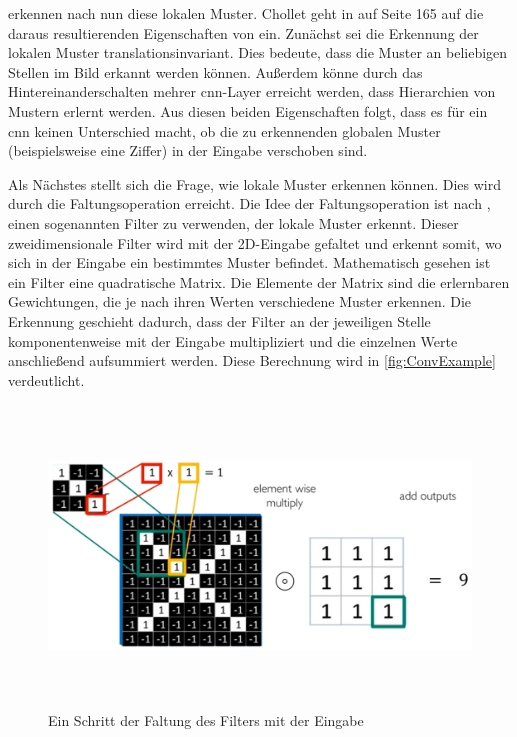  erkennen nach \cite[S. 164]{DeepLearningPythonKeras} nun diese lokalen Muster.
Chollet geht in \cite{DeepLearningPythonKeras} auf Seite 165 auf die daraus resultierenden Eigenschaften von  ein.
Zunächst sei die Erkennung der lokalen Muster translationsinvariant.
Dies bedeute, dass die Muster an beliebigen Stellen im Bild erkannt werden können.
Außerdem könne durch das Hintereinanderschalten mehrer \acrshort{cnn}-Layer erreicht werden, dass Hierarchien von Mustern erlernt werden.
Aus diesen beiden Eigenschaften folgt, dass es für ein \acrshort{cnn} keinen Unterschied macht, ob die zu erkennenden globalen Muster (beispielsweise eine Ziffer) in der Eingabe verschoben sind.

Als Nächstes stellt sich die Frage, wie  lokale Muster erkennen können.
Dies wird durch die Faltungsoperation erreicht.
Die Idee der Faltungsoperation ist nach \cite{6S191CNN}, einen sogenannten Filter zu verwenden, der lokale Muster erkennt.
Dieser zweidimensionale Filter wird mit der 2D-Eingabe gefaltet und erkennt somit, wo sich in der Eingabe ein bestimmtes Muster befindet.
Mathematisch gesehen ist ein Filter eine quadratische Matrix.
Die Elemente der Matrix sind die erlernbaren Gewichtungen, die je nach ihren Werten verschiedene Muster erkennen.
Die Erkennung geschieht dadurch, dass der Filter an der jeweiligen Stelle komponentenweise mit der Eingabe multipliziert und die einzelnen Werte anschließend aufsummiert werden.
Diese Berechnung wird in \autoref{fig:ConvExample} verdeutlicht.

\begin{figure}[h]
    \centering
    \includegraphics[width=1.0\textwidth,height=8cm,keepaspectratio=true]{content/images/ConvExample.png}
    \caption{Ein Schritt der Faltung des Filters mit der Eingabe \cite{6S191CNN}}
    \label{fig:ConvExample}
\end{figure}

